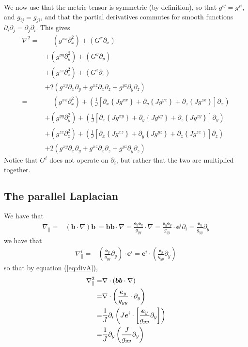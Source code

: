 \documentclass[12pt]{article}
\def\L{\left}
\def\R{\right}
\newcommand{\Grad}{\ensuremath{\nabla}}
\newcommand{\ve}[1]{\ensuremath{\boldsymbol{#1}}}
\newcommand{\Div}[1]{\ensuremath{\nabla\cdot #1 }}
\begin{document}
%
We now use that the metric tensor is symmetric (by definition), so that
$g^{ij}=g^{ji}$, and $g_{ij}=g_{ji}$, and that the partial derivatives commutes
for smooth functions $\partial_i\partial_j=\partial_j\partial_i$.  This gives
%
\begin{align*}
    \Grad^2 =&\quad \, \L(g^{xx} \partial_x^2 \R) + \L(G^x \partial_x\R)\\ &+
    \L(g^{yy} \partial_y^2 \R) + \L(G^y \partial_y\R)\\ &+ \L(g^{zz}
    \partial_z^2\R) + \L(G^z \partial_z\R)\\ &+ 2\L( g^{xy} \partial_x
    \partial_y + g^{xz} \partial_x \partial_z + g^{yz} \partial_y \partial_z
    \R)\\
%
           =&\quad \, \L(g^{xx} \partial_x^2\R) + \L( \frac{1}{J} \L[
\partial_x \L\{J g^{xx} \R\} + \partial_y \L\{J g^{yx} \R\} + \partial_z \L\{J
g^{zx} \R\} \R] \partial_x\R)\\ &+ \L(g^{yy} \partial_y^2\R) + \L( \frac{1}{J}
    \L[ \partial_x \L\{J g^{xy} \R\} + \partial_y \L\{J g^{yy} \R\} +
    \partial_z \L\{J g^{zy} \R\} \R] \partial_y\R)\\ &+ \L(g^{zz}
        \partial_z^2\R) + \L( \frac{1}{J} \L[ \partial_x \L\{J g^{xz} \R\} +
        \partial_y \L\{J g^{yz} \R\} + \partial_z \L\{J g^{zz} \R\} \R]
        \partial_z\R)\\ &+ 2\L( g^{xy} \partial_x \partial_y + g^{xz}
        \partial_x \partial_z + g^{yz} \partial_y \partial_z \R)
\end{align*}
%
Notice that $G^i$ does not operate on $\partial_i$, but rather that the two are
multiplied together.
%



\subsection{The parallel Laplacian}
%
We have that
%
\begin{align*}
    \Grad_\| =& \L(\ve{b} \cdot \Grad\R) \ve{b}\ = \ve{b} \ve{b} \cdot \Grad =
    \frac{\ve{e}_y \ve{e}_y}{g_{yy}} \cdot \Grad = \frac{\ve{e}_y
    \ve{e}_y}{g_{yy}} \cdot \ve{e}^i \partial_i = \frac{\ve{e}_y}{g_{yy}}
    \partial_y
\end{align*}
%
we have that
%
\begin{align*}
    \Grad_\|^i =& \L(\frac{\ve{e}_y}{g_{yy}} \partial_y\R)\cdot \ve{e}^i =
    \ve{e}^i \cdot \L(\frac{\ve{e}_y}{g_{yy}} \partial_y\R)
\end{align*}
%
so that by equation (\ref{eq:divA}),
%
\begin{align*}
    \Grad_\|^2 =& \Div\L(\ve{b} \ve{b} \cdot \Grad\R)\\ =&
    \Div\L(\frac{\ve{e}_y}{g_{yy}} \cdot \partial_y\R)\\ =& \frac{1}{J}
    \partial_i \L( J\ve{e}^i \cdot \L[\frac{\ve{e}_y}{g_{yy}} \partial_y\R]
    \R)\\ =& \frac{1}{J} \partial_y \L(\frac{J}{g_{yy}} \partial_y\R)
\end{align*}
%
\end{document}
